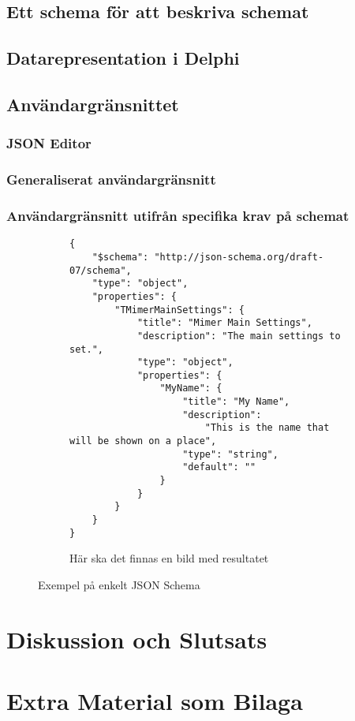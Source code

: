 \documentclass[swedish]{kththesis}
\begin{document}
\section{Ett schema för att beskriva schemat}

\section{Datarepresentation i Delphi}

\section{Användargränsnittet}

\subsection{JSON Editor}

\subsection{Generaliserat användargränsnitt}

\subsection{Användargränsnitt utifrån specifika krav på schemat}
\begin{figure}
	\begin{subfigure}{\textwidth}
		\begin{verbatim}
{
	"$schema": "http://json-schema.org/draft-07/schema",
	"type": "object",
	"properties": {
		"TMimerMainSettings": {
			"title": "Mimer Main Settings",
			"description": "The main settings to set.",
			"type": "object",
			"properties": {
				"MyName": {
					"title": "My Name",
					"description":
						"This is the name that will be shown on a place",
					"type": "string",
					"default": ""
				}
			}
		}
	}
}
		\end{verbatim}
		\vspace{2em}
	\end{subfigure}
	\begin{subfigure}{\textwidth}
		Här ska det finnas en bild med resultatet
	\end{subfigure}
	\caption{Exempel på enkelt JSON Schema}
\end{figure}

\chapter{Diskussion och Slutsats}

\printbibliography[heading=bibintoc] %

\appendix

\chapter{Extra Material som Bilaga}
\end{document}
